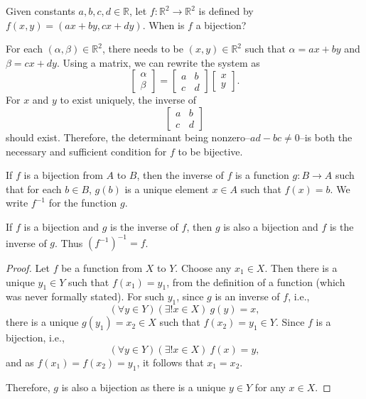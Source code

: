 \documentclass[../main.tex]{subfiles}
\begin{document}
\begin{ex}
    Given constants $a, b, c, d \in \mathbb{R}$, let $f: \mathbb{R}^2 \rightarrow \mathbb{R}^2$ is defined by $f(x, y) = (ax + by, cx + dy)$.
    When is $f$ a bijection?
\end{ex}
\begin{sol}
    For each $(\alpha, \beta) \in \mathbb{R}^2$, there needs to be $(x, y) \in \mathbb{R}^2$ such that $\alpha = ax + by$ and $\beta = cx + dy$.
    Using a matrix, we can rewrite the system as
    \[
        \begin{bmatrix}
            \alpha\\
            \beta
        \end{bmatrix}
        =
        \begin{bmatrix}
            a & b\\
            c & d
        \end{bmatrix}
        \begin{bmatrix}
            x\\
            y
        \end{bmatrix}.
    \]
    For $x$ and $y$ to exist uniquely, the inverse of
    \[
        \begin{bmatrix}
            a & b\\
            c & d
        \end{bmatrix}
    \]
    should exist.
    Therefore, the determinant being nonzero--$ad - bc \neq 0$--is both the necessary and sufficient condition for $f$ to be bijective.
\end{sol}

\begin{defn}
    If $f$ is a bijection from $A$ to $B$, then the \textsf{inverse} of $f$ is a function $g: B \rightarrow A$ such that for each $b \in B$, $g(b)$ is a unique element $x \in A$ such that $f(x) = b$.
    We write $f^{-1}$ for the function $g$.
\end{defn}

\begin{ex}
    If $f$ is a bijection and $g$ is the inverse of $f$, then $g$ is also a bijection and $f$ is the inverse of $g$.
    Thus $(f^{-1})^{-1} = f$.
\end{ex}
\begin{proof}
    Let $f$ be a function from $X$ to $Y$.
    Choose any $x_1 \in X$.
    Then there is a unique $y_1 \in Y$ such that $f(x_1) = y_1$, from the definition of a function (which was never formally stated).
    For such $y_1$, since $g$ is an inverse of $f$, i.e.,
    \[
        (\forall y \in Y)(\exists ! x \in X)\ g(y) = x,
    \]
    there is a unique $g(y_1) = x_2 \in X$ such that $f(x_2) = y_1 \in Y$.
    Since $f$ is a bijection, i.e.,
    \[
        (\forall y \in Y)(\exists ! x \in X)\ f(x) = y,
    \]
    and as $f(x_1) = f(x_2) = y_1$, it follows that $x_1 = x_2$.

    Therefore, $g$ is also a bijection as there is a unique $y \in Y$ for any $x \in X$.
\end{proof}
\end{document}

